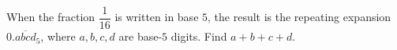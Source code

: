 When the fraction $\dfrac{1}{16}$ is written in base $5$, the result is the repeating expansion $0.\overline{abcd}_5$, where $a,b,c,d$ are base-$5$ digits. Find $a+b+c+d$.
